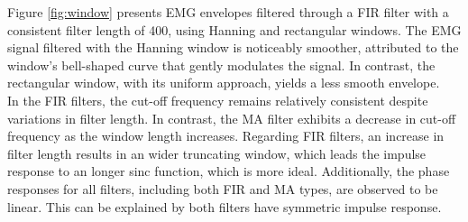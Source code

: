 \documentclass[8pt]{article}  %
\theoremstyle{plain}
\theoremstyle{definition}
\theoremstyle{remark}
\begin{document}
\begin{minipage}{0.49\textwidth}
         \vspace{0.3cm}
         Figure \ref{fig:window} presents EMG envelopes filtered through a FIR filter with a consistent filter length of 400, 
         using Hanning and rectangular windows. 
         The EMG signal filtered with the Hanning window is noticeably smoother, 
         attributed to the window's bell-shaped curve that gently modulates the signal. 
         In contrast, the rectangular window, 
         with its uniform approach, yields a less smooth envelope.\\

         In the FIR filters, the cut-off frequency remains relatively consistent despite variations in filter length. 
         In contrast, the MA filter exhibits a decrease in cut-off frequency as the window length increases. 
         Regarding FIR filters, an increase in filter length results in an wider truncating window, 
         which leads the impulse response to an longer sinc function, which is more ideal. 
         Additionally, the phase responses for all filters, 
         including both FIR and MA types, 
         are observed to be linear.
         This can be explained by both filters have symmetric impulse response.


    \end{minipage}
    \hfill
\end{document}
